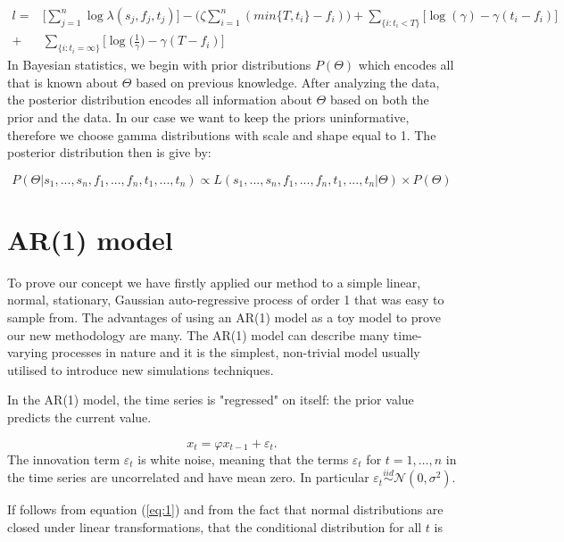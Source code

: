 \documentclass[11pt,a4paper]{article}
\newcommand{\eps}{\varepsilon}
\begin{document}
\[
\begin{aligned}
l = & \Bigg[ \sum_{j=1}^{n} \log \lambda(s_{j},f_{j}, t_{j}) \Bigg] - \bigg(\zeta \sum_{i=1}^{n} (min\{ T, t_i \} - f_i) \bigg)  + \sum_{\{ i : t_{i} < T \} }  \bigg[\log (\gamma) -\gamma(t_{i} - f_{i}) \bigg] \\
+ & \sum_{ \{ i : t_{i} = \infty \} } \bigg[\log \bigg(\frac{1}{\gamma}\bigg) -\gamma(T - f_{i}) \bigg]
\end{aligned}
\]
In Bayesian statistics, we begin with prior distributions $P(\Theta)$ which encodes all that is known about $\Theta$ based on previous knowledge. After analyzing the data, the posterior distribution encodes all information about $\Theta$ based on both the prior and the data. In our case we want to keep the priors uninformative, therefore we choose gamma distributions with scale and shape equal to 1. The posterior distribution then is give by:

\[
P(\Theta | s_{1}, ..., s_{n}, f_{1}, ... , f_{n}, t_{1}, ..., t_{n}) \propto L(s_{1}, ..., s_{n}, f_{1}, ... , f_{n}, t_{1}, ..., t_{n} | \Theta) \times P(\Theta)
\]






\section{AR(1) model}

To prove our concept we have firstly applied our method to a simple linear, normal, stationary, Gaussian auto-regressive process of order 1 that was easy to sample from. The advantages of using an AR(1) model as a toy model to prove our new methodology are many. The AR(1) model can describe many time-varying processes in nature and it is the simplest, non-trivial model usually utilised to introduce new simulations techniques.

In the AR(1) model, the time series is "regressed" on itself: the prior value predicts the current value.

\begin{equation} \label{eq:1}
x_{t} = \varphi x_{t-1} + \eps_{t}.
\end{equation}
The innovation term $\eps_t$ is white noise, meaning that the terms $\eps_t$ for $t = 1 , \dots, n$ in the time series are uncorrelated and have mean zero. In particular $\eps_{t} \stackrel{iid}{\sim} \mathcal{N}(0, \sigma^{2})$.

If follows from equation (\ref{eq:1}) and from the fact that normal distributions are closed under linear transformations, that the conditional distribution for all $t$ is
\end{document}
